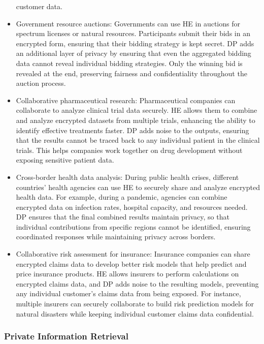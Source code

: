 \documentclass[
  letterpaper,
  DIV=11,
  numbers=noendperiod,
  oneside]{scrartcl}
\begin{document}
\begin{itemize}
  customer data.
\item
  Government resource auctions: Governments can use HE in auctions for
  spectrum licenses or natural resources. Participants submit their bids
  in an encrypted form, ensuring that their bidding strategy is kept
  secret. DP adds an additional layer of privacy by ensuring that even
  the aggregated bidding data cannot reveal individual bidding
  strategies. Only the winning bid is revealed at the end, preserving
  fairness and confidentiality throughout the auction process.
\item
  Collaborative pharmaceutical research: Pharmaceutical companies can
  collaborate to analyze clinical trial data securely. HE allows them to
  combine and analyze encrypted datasets from multiple trials, enhancing
  the ability to identify effective treatments faster. DP adds noise to
  the outputs, ensuring that the results cannot be traced back to any
  individual patient in the clinical trials. This helps companies work
  together on drug development without exposing sensitive patient data.
\item
  Cross-border health data analysis: During public health crises,
  different countries' health agencies can use HE to securely share and
  analyze encrypted health data. For example, during a pandemic,
  agencies can combine encrypted data on infection rates, hospital
  capacity, and resources needed. DP ensures that the final combined
  results maintain privacy, so that individual contributions from
  specific regions cannot be identified, ensuring coordinated responses
  while maintaining privacy across borders.
\item
  Collaborative risk assessment for insurance: Insurance companies can
  share encrypted claims data to develop better risk models that help
  predict and price insurance products. HE allows insurers to perform
  calculations on encrypted claims data, and DP adds noise to the
  resulting models, preventing any individual customer's claims data
  from being exposed. For instance, multiple insurers can securely
  collaborate to build risk prediction models for natural disasters
  while keeping individual customer claims data confidential.
\end{itemize}

\subsubsection{Private Information
Retrieval}\label{private-information-retrieval}
\end{document}

